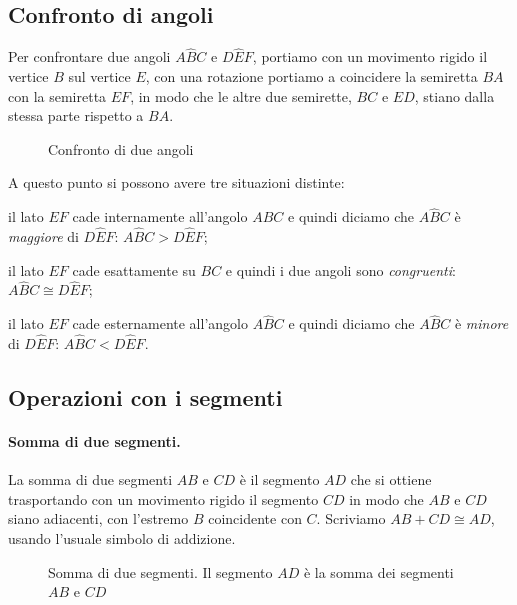 \subsection{Confronto di angoli}

Per confrontare due angoli \(A\widehat{B}C\) e \(D\widehat{E}F\), 
portiamo con un movimento rigido il vertice \(B\) sul vertice \(E\), con 
una rotazione portiamo a coincidere la semiretta \(BA\) con la 
semiretta \(EF\), in modo che le altre due semirette, \(BC\) e \(ED\), 
stiano dalla stessa parte rispetto a \(BA\).


\begin{inaccessibleblock}
 \begin{figure}[htb]
\centering
\caption{Confronto di due angoli}
\end{figure}
\end{inaccessibleblock}

A questo punto si possono avere tre situazioni distinte:
\begin{itemize*}
\item il lato \(EF\) cade internamente all'angolo \(A\widehat{B}C\) e 
quindi diciamo che \(A\widehat{B}C\) è \emph{maggiore} di 
\(D\widehat{E}F\): \(A\widehat{B}C>D\widehat{E}F\);
\item il lato \(EF\) cade esattamente su \(BC\) e quindi i due angoli 
sono \emph{congruenti}: \(A\widehat{B}C\cong D\widehat{E}F\);
\item il lato \(EF\) cade esternamente all'angolo \(A\widehat{B}C\) e 
quindi diciamo che \(A\widehat{B}C\) è \emph{minore} di 
\(D\widehat{E}F\): \(A\widehat{B}C<D\widehat{E}F\).
\end{itemize*}

\subsection{Operazioni con i segmenti}

\paragraph{Somma di due segmenti.} La somma di due segmenti \(AB\) e 
\(CD\) è il segmento \(AD\) che si ottiene trasportando con un movimento 
rigido il segmento \(CD\) in modo che \(AB\) e \(CD\) siano adiacenti, con 
l'estremo \(B\) coincidente con \(C\). Scriviamo \(AB + CD \cong AD\), 
usando l'usuale simbolo di addizione.


\begin{inaccessibleblock}
 \begin{figure}[htb]
\centering
\caption{Somma di due segmenti. Il segmento \(AD\) è la somma dei 
segmenti \(AB\) e \(CD\)}
\end{figure}
\end{inaccessibleblock}

